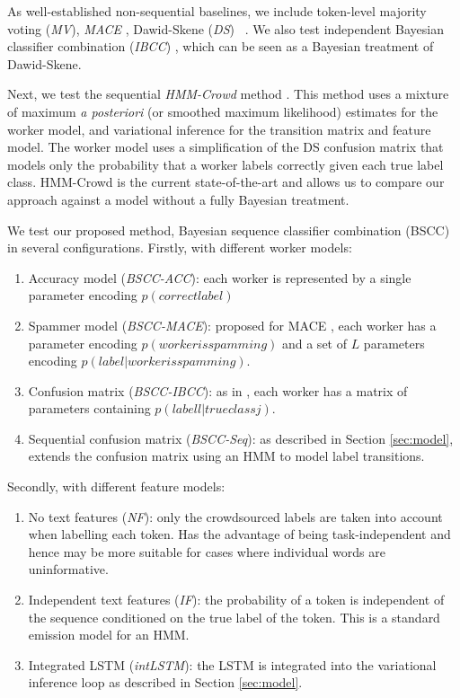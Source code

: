 As well-established non-sequential baselines, we include token-level majority voting (\emph{MV}), \emph{MACE} \cite{hovy2013learning}, Dawid-Skene (\emph{DS}) ~\cite{dawid_maximum_1979}.  We also test independent Bayesian classifier combination (\emph{IBCC}) \cite{kim2012bayesian,simpson_long_paper}, which can be seen as a Bayesian treatment of Dawid-Skene. 

Next, we test the sequential \emph{HMM-Crowd} method \cite{nguyen2017aggregating}. This method uses a mixture of maximum \emph{a posteriori} (or smoothed maximum likelihood) estimates for the worker model, and variational inference for the transition matrix and feature model. The worker model uses a simplification of the DS confusion matrix that models only the probability that a worker labels correctly given each true label class. HMM-Crowd is the current state-of-the-art and allows us to compare our approach against a model without a fully Bayesian treatment. 

We test our proposed method, Bayesian sequence classifier combination (BSCC) in several configurations. Firstly, with different worker models:
\begin{enumerate}
\item Accuracy model (\emph{BSCC-ACC}): each worker is represented by a single parameter encoding $p( correct label )$
\item Spammer model (\emph{BSCC-MACE}): proposed for MACE \cite{hovy2013learning}, each worker has a parameter encoding 
$p( worker is spamming )$ and a set of $L$ parameters encoding $p( label | worker is spamming)$.
\item Confusion matrix (\emph{BSCC-IBCC}): as in \cite{simpsonlong}, each worker has a matrix of parameters containing $p( label l | true class j)$.
\item Sequential confusion matrix (\emph{BSCC-Seq}): as described in Section \ref{sec:model}, extends the confusion matrix using an HMM to model label transitions.
\end{enumerate}
Secondly, with different feature models:
\begin{enumerate}
\item No text features (\emph{NF}): only the crowdsourced labels are taken into account when labelling each token. Has the advantage of being task-independent and hence may be more suitable for cases where individual words are uninformative.
\item Independent text features (\emph{IF}): the probability of a token is independent of the sequence conditioned on the true label of the token. This is a standard emission model for an HMM.
\item Integrated LSTM (\emph{intLSTM}): the LSTM is integrated into the variational inference loop as described in Section \ref{sec:model}.
\end{enumerate}


